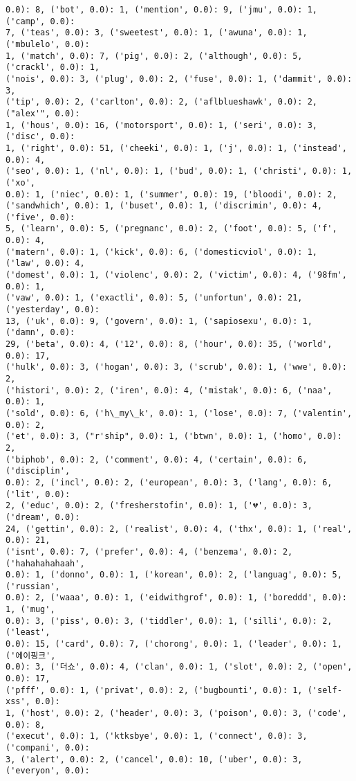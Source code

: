 \documentclass[11pt]{article}
\begin{document}
\begin{Verbatim}[commandchars=\\\{\}]
0.0): 8, ('bot', 0.0): 1, ('mention', 0.0): 9, ('jmu', 0.0): 1, ('camp', 0.0):
7, ('teas', 0.0): 3, ('sweetest', 0.0): 1, ('awuna', 0.0): 1, ('mbulelo', 0.0):
1, ('match', 0.0): 7, ('pig', 0.0): 2, ('although', 0.0): 5, ('crackl', 0.0): 1,
('nois', 0.0): 3, ('plug', 0.0): 2, ('fuse', 0.0): 1, ('dammit', 0.0): 3,
('tip', 0.0): 2, ('carlton', 0.0): 2, ('aflblueshawk', 0.0): 2, ("alex'", 0.0):
1, ('hous', 0.0): 16, ('motorsport', 0.0): 1, ('seri', 0.0): 3, ('disc', 0.0):
1, ('right', 0.0): 51, ('cheeki', 0.0): 1, ('j', 0.0): 1, ('instead', 0.0): 4,
('seo', 0.0): 1, ('nl', 0.0): 1, ('bud', 0.0): 1, ('christi', 0.0): 1, ('xo',
0.0): 1, ('niec', 0.0): 1, ('summer', 0.0): 19, ('bloodi', 0.0): 2,
('sandwhich', 0.0): 1, ('buset', 0.0): 1, ('discrimin', 0.0): 4, ('five', 0.0):
5, ('learn', 0.0): 5, ('pregnanc', 0.0): 2, ('foot', 0.0): 5, ('f', 0.0): 4,
('matern', 0.0): 1, ('kick', 0.0): 6, ('domesticviol', 0.0): 1, ('law', 0.0): 4,
('domest', 0.0): 1, ('violenc', 0.0): 2, ('victim', 0.0): 4, ('98fm', 0.0): 1,
('vaw', 0.0): 1, ('exactli', 0.0): 5, ('unfortun', 0.0): 21, ('yesterday', 0.0):
13, ('uk', 0.0): 9, ('govern', 0.0): 1, ('sapiosexu', 0.0): 1, ('damn', 0.0):
29, ('beta', 0.0): 4, ('12', 0.0): 8, ('hour', 0.0): 35, ('world', 0.0): 17,
('hulk', 0.0): 3, ('hogan', 0.0): 3, ('scrub', 0.0): 1, ('wwe', 0.0): 2,
('histori', 0.0): 2, ('iren', 0.0): 4, ('mistak', 0.0): 6, ('naa', 0.0): 1,
('sold', 0.0): 6, ('h\_my\_k', 0.0): 1, ('lose', 0.0): 7, ('valentin', 0.0): 2,
('et', 0.0): 3, ("r'ship", 0.0): 1, ('btwn', 0.0): 1, ('homo', 0.0): 2,
('biphob', 0.0): 2, ('comment', 0.0): 4, ('certain', 0.0): 6, ('disciplin',
0.0): 2, ('incl', 0.0): 2, ('european', 0.0): 3, ('lang', 0.0): 6, ('lit', 0.0):
2, ('educ', 0.0): 2, ('fresherstofin', 0.0): 1, ('💔', 0.0): 3, ('dream', 0.0):
24, ('gettin', 0.0): 2, ('realist', 0.0): 4, ('thx', 0.0): 1, ('real', 0.0): 21,
('isnt', 0.0): 7, ('prefer', 0.0): 4, ('benzema', 0.0): 2, ('hahahahahaah',
0.0): 1, ('donno', 0.0): 1, ('korean', 0.0): 2, ('languag', 0.0): 5, ('russian',
0.0): 2, ('waaa', 0.0): 1, ('eidwithgrof', 0.0): 1, ('boreddd', 0.0): 1, ('mug',
0.0): 3, ('piss', 0.0): 3, ('tiddler', 0.0): 1, ('silli', 0.0): 2, ('least',
0.0): 15, ('card', 0.0): 7, ('chorong', 0.0): 1, ('leader', 0.0): 1, ('에이핑크',
0.0): 3, ('더쇼', 0.0): 4, ('clan', 0.0): 1, ('slot', 0.0): 2, ('open', 0.0): 17,
('pfff', 0.0): 1, ('privat', 0.0): 2, ('bugbounti', 0.0): 1, ('self-xss', 0.0):
1, ('host', 0.0): 2, ('header', 0.0): 3, ('poison', 0.0): 3, ('code', 0.0): 8,
('execut', 0.0): 1, ('ktksbye', 0.0): 1, ('connect', 0.0): 3, ('compani', 0.0):
3, ('alert', 0.0): 2, ('cancel', 0.0): 10, ('uber', 0.0): 3, ('everyon', 0.0):

\end{Verbatim}
\end{document}
